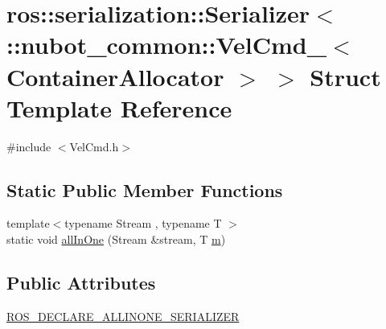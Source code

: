 \hypertarget{structros_1_1serialization_1_1Serializer_3_01_1_1nubot__common_1_1VelCmd___3_01ContainerAllocator_01_4_01_4}{\section{ros\-:\-:serialization\-:\-:Serializer$<$ \-:\-:nubot\-\_\-common\-:\-:Vel\-Cmd\-\_\-$<$ Container\-Allocator $>$ $>$ Struct Template Reference}
\label{structros_1_1serialization_1_1Serializer_3_01_1_1nubot__common_1_1VelCmd___3_01ContainerAllocator_01_4_01_4}
}


{\ttfamily \#include $<$Vel\-Cmd.\-h$>$}

\subsection*{Static Public Member Functions}
\begin{DoxyCompactItemize}
\item 
{\footnotesize template$<$typename Stream , typename T $>$ }\\static void \hyperlink{structros_1_1serialization_1_1Serializer_3_01_1_1nubot__common_1_1VelCmd___3_01ContainerAllocator_01_4_01_4_a31e29ae751795f159e42a11e24e2b2bb}{all\-In\-One} (Stream \&stream, T \hyperlink{nubot__gazebo_8cc_a9990e99e87d163c58817550b21d35a83}{m})
\end{DoxyCompactItemize}
\subsection*{Public Attributes}
\begin{DoxyCompactItemize}
\item 
\hyperlink{structros_1_1serialization_1_1Serializer_3_01_1_1nubot__common_1_1VelCmd___3_01ContainerAllocator_01_4_01_4_ad8cb08bcf755232b0a65e9d1b553756d}{R\-O\-S\-\_\-\-D\-E\-C\-L\-A\-R\-E\-\_\-\-A\-L\-L\-I\-N\-O\-N\-E\-\_\-\-S\-E\-R\-I\-A\-L\-I\-Z\-E\-R}
\end{DoxyCompactItemize}


